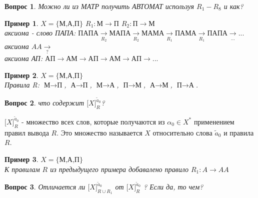 \documentclass{article}
\newtheorem{example}{Пример}
\newtheorem{question}{Вопрос}
\numberwithin{example}{section}
\numberwithin{question}{section}
\numberwithin{Remark}{section}
\numberwithin{theorem}{section}
\numberwithin{definition}{section}
\numberwithin{proposition}{section}
\begin{document}
\begin{question}
	Можно ли из МАТР получить АВТОМАТ используя $R_1-R_8$ и как?
\end{question}
\begin{example}
	$X=\{\text{М,А,П}\}$   $R_1:\text{М}\to\text{П}$   $R_2:\text{П}\to\text{М}$\\
	аксиома - слово ПАПА: $\text{ПАПА}\xrightarrow[R_2]{}\text{МАПА}\xrightarrow[R_2]{}\text{МАМА}\xrightarrow[R_1]{}\text{ПАМА}\xrightarrow[R_1]{}\text{ПАПА}\xrightarrow[...]{}...$\\
	аксиома $AA\xrightarrow[?]{}$\\
	аксиома АП: $\text{АП}\to\text{АМ}\to\text{АП}\to\text{АМ}\to\text{АП}\to...$
\end{example}
\begin{example}
$X=\{\text{М,А,П}\}$\\
Правила R: $\text{М}\to\text{П}$, $\text{А}\to\text{П}$, $\text{М}\to\text{А}$, $\text{П}\to\text{М}$, $\text{А}\to\text{М}$, $\text{П}\to\text{А}$.
\end{example}
\begin{question}
	что содержит $\big[X\big]^{\widetilde{a}_0}_R$?
\end{question}
$\big[X\big]^{\widetilde{a}_0}_R$ - множество всех слов, которые получаются из $\alpha_0\in X^*$ применением правил вывода $R$. Это множество называется \underline{} $X$ относительно слова $\widetilde{a}_0$ и правила $R$.
\begin{example}
$X=\{\text{М,А,П}\}$\\
К правилам $R$ из предыдущего примера добавалено правило $R_1:A\to AA$
\end{example}
\begin{question}
Отличается ли $\big[X\big]^{\widetilde{a}_0}_{R\cup R_1}$ от $\big[X\big]^{\widetilde{a}_0}_R$ ? Если да, то чем?
\end{question}
\end{document}
